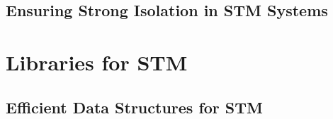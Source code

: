 \documentclass[11pt]{book}
\begin{document}
\chapter{Ensuring Strong Isolation in STM Systems}
\label{chap:SI}
%






\part{Libraries for STM}


\chapter{Efficient Data Structures for STM}
\label{chap:STMlib}
% 

\end{document}
